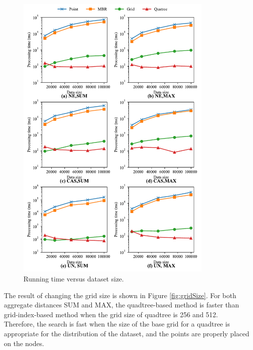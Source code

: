 \documentclass[a4paper,11pt]{report}
\theoremstyle{mytheoremstyle}
\begin{document}
\begin{figure}
    \begin{center}
        \includegraphics[width=0.86\textwidth]{matplotlib/export/datasize.pdf}
    \end{center}
    \caption{Running time versus dataset size.}
    \label{fig:dataSize}
\end{figure}

The result of changing the grid size is shown in Figure \ref{fig:gridSize}. For both aggregate distances SUM and MAX, the quadtree-based method is faster than grid-index-based method when the grid size of quadtree is 256 and 512. Therefore, the search is fast when the size of the base grid for a quadtree is appropriate for the distribution of the dataset, and the points are properly placed on the nodes.
\end{document}
